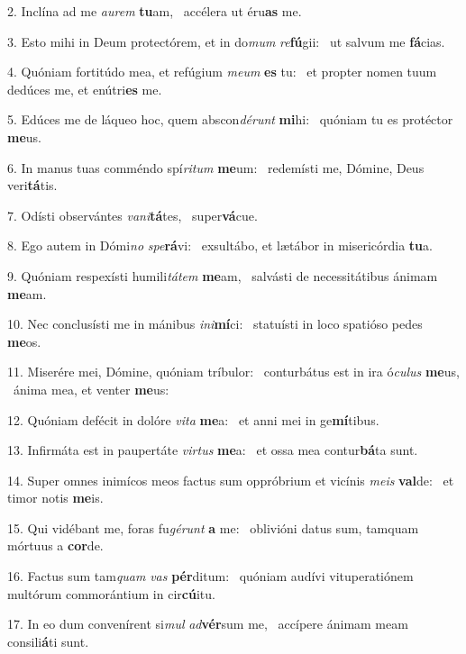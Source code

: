 2. Inclína ad me \textit{au}\textit{rem} \textbf{tu}am, \ast\  accélera ut éru\textbf{as} me.\

3. Esto mihi in Deum protectórem, et in do\textit{mum} \textit{re}\textbf{fú}gii: \ast\  ut salvum me \textbf{fá}cias.\

4. Quóniam fortitúdo mea, et refúgium \textit{me}\textit{um} \textbf{es} tu: \ast\  et propter nomen tuum dedúces me, et enútri\textbf{es} me.\

5. Edúces me de láqueo hoc, quem abscon\textit{dé}\textit{runt} \textbf{mi}hi: \ast\  quóniam tu es protéctor \textbf{me}us.\

6. In manus tuas comméndo spí\textit{ri}\textit{tum} \textbf{me}um: \ast\  redemísti me, Dómine, Deus veri\textbf{tá}tis.\

7. Odísti observántes \textit{va}\textit{ni}\textbf{tá}tes, \ast\  super\textbf{vá}cue.\

8. Ego autem in Dómi\textit{no} \textit{spe}\textbf{rá}vi: \ast\  exsultábo, et lætábor in misericórdia \textbf{tu}a.\

9. Quóniam respexísti humili\textit{tá}\textit{tem} \textbf{me}am, \ast\  salvásti de necessitátibus ánimam \textbf{me}am.\

10. Nec conclusísti me in mánibus \textit{in}\textit{i}\textbf{mí}ci: \ast\  statuísti in loco spatióso pedes \textbf{me}os.\

11. Miserére mei, Dómine, quóniam tríbulor: \dag\  conturbátus est in ira ó\textit{cu}\textit{lus} \textbf{me}us, \ast\  ánima mea, et venter \textbf{me}us:\

12. Quóniam defécit in dolóre \textit{vi}\textit{ta} \textbf{me}a: \ast\  et anni mei in ge\textbf{mí}tibus.\

13. Infirmáta est in paupertáte \textit{vir}\textit{tus} \textbf{me}a: \ast\  et ossa mea contur\textbf{bá}ta sunt.\

14. Super omnes inimícos meos factus sum oppróbrium et vicínis \textit{me}\textit{is} \textbf{val}de: \ast\  et timor notis \textbf{me}is.\

15. Qui vidébant me, foras fu\textit{gé}\textit{runt} \textbf{a} me: \ast\  oblivióni datus sum, tamquam mórtuus a \textbf{cor}de.\

16. Factus sum tam\textit{quam} \textit{vas} \textbf{pér}ditum: \ast\  quóniam audívi vituperatiónem multórum commorántium in cir\textbf{cú}itu.\

17. In eo dum convenírent si\textit{mul} \textit{ad}\textbf{vér}sum me, \ast\  accípere ánimam meam consili\textbf{á}ti sunt.\

